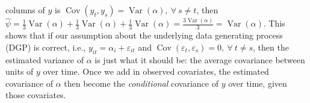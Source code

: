 \documentclass[]{interact}
\theoremstyle{plain}%
\theoremstyle{definition}
\theoremstyle{remark}
\begin{document}
columns of \(y\) is
\(\mathop{\mathrm{\mathrm{Cov}}}(y_{t},y_{s}) = \mathop{\mathrm{\mathrm{Var}}}(\alpha), \ \forall \ s \ne t\),
then
\(\hat{\psi} = \frac{1}{3}\mathop{\mathrm{\mathrm{Var}}}(\alpha) + \frac{1}{3}\mathop{\mathrm{\mathrm{Var}}}(\alpha) + \frac{1}{3}\mathop{\mathrm{\mathrm{Var}}}(\alpha) = \frac{3 \mathop{\mathrm{\mathrm{Var}}}(\alpha)}{3} = \mathop{\mathrm{\mathrm{Var}}}(\alpha)\).
This shows that if our assumption about the underlying data generating
process (DGP) is correct, i.e.,
\(y_{it} = \alpha_{i} + \varepsilon_{it}\) and
\(\mathop{\mathrm{\mathrm{Cov}}}(\varepsilon_{t},\varepsilon_{s}) = 0, \ \forall \ t \ne s\),
then the estimated variance of \(\alpha\) is just what it should be: the
average covariance between units of \(y\) over time. Once we add in
observed covariates, the estimated covariance of \(\alpha\) then become
the \textit{conditional} covariance of \(y\) over time, given those
covariates.
\end{document}
